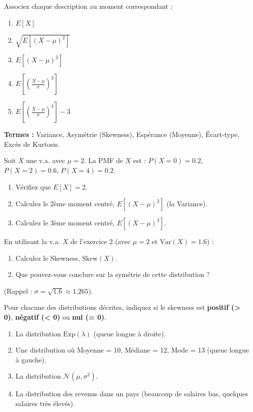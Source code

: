 \begin{exercicebox}
Associez chaque description au moment correspondant :
\begin{enumerate}
    \item $E[X]$
    \item $\sqrt{E[(X-\mu)^2]}$
    \item $E[(X-\mu)^2]$
    \item $E[\left(\frac{X-\mu}{\sigma}\right)^3]$
    \item $E[\left(\frac{X-\mu}{\sigma}\right)^4] - 3$
\end{enumerate}

\textbf{Termes :} Variance, Asymétrie (Skewness), Espérance (Moyenne), Écart-type, Excès de Kurtosis.
\end{exercicebox}

\begin{exercicebox}
Soit $X$ une v.a. avec $\mu = 2$. La PMF de $X$ est :
$P(X=0)=0.2$, $P(X=2)=0.6$, $P(X=4)=0.2$.
\begin{enumerate}
    \item Vérifiez que $E[X] = 2$.
    \item Calculez le 2ème moment centré, $E[(X-\mu)^2]$ (la Variance).
    \item Calculez le 3ème moment centré, $E[(X-\mu)^3]$.
\end{enumerate}
\end{exercicebox}

\begin{exercicebox}
En utilisant la v.a. $X$ de l'exercice 2 (avec $\mu=2$ et $\text{Var}(X) = 1.6$) :
\begin{enumerate}
    \item Calculez le Skewness, $\text{Skew}(X)$.
    \item Que pouvez-vous conclure sur la symétrie de cette distribution ?
\end{enumerate}
(Rappel : $\sigma = \sqrt{1.6} \approx 1.265$).
\end{exercicebox}


\begin{exercicebox}
Pour chacune des distributions décrites, indiquez si le skewness est \textbf{positif (> 0)}, \textbf{négatif (< 0)} ou \textbf{nul (= 0)}.
\begin{enumerate}
    \item La distribution $\text{Exp}(\lambda)$ (queue longue à droite).
    \item Une distribution où Moyenne = 10, Médiane = 12, Mode = 13 (queue longue à gauche).
    \item La distribution $\mathcal{N}(\mu, \sigma^2)$.
    \item La distribution des revenus dans un pays (beaucoup de salaires bas, quelques salaires très élevés).
\end{enumerate}
\end{exercicebox}

